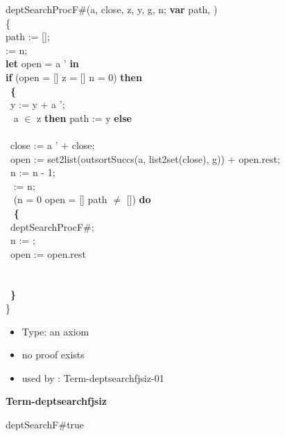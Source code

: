 \documentclass[a4paper]{article}
\begin{document}
deptSearchProcF\#(a, close, z, y, g, n; {\bf var} path, ) \\
\{\\
path := [];\\
  := n;\\
 {\bf let} open = a ' {\bf in}\\
 {\bf if} \Not (open = [] \Or z = [] \Or n = 0) {\bf then}\\
 \tabif\  {\bf \{}\\
 \tabif\ \tabbe y := y + a ';\\
 \tabif\  a $\in$ z {\bf then} path := y {\bf else}\\
 \tabif\ \tabbe  {\bf \{}\\
 \tabif\ \tabbe \tabbe close := a ' + close;\\
 \tabif\ \tabbe \tabbe open := set2list(outsortSuccs(a, list2set(close), g)) + open.rest;\\
 \tabif\ \tabbe \tabbe n := n - 1;\\
 \tabif\ \tabbe \tabbe {} := n;\\
 \tabif\ \tabbe {} \Not (n = 0 \Or open = [] \Or path $\neq$ []) {\bf do}\\
 \tabif\ \tabbe \tabbe {} {\bf \{}\\
 \tabif\ \tabbe \tabbe {}\tabbe deptSearchProcF\#;\\
 \tabif\ \tabbe \tabbe {}\tabbe n := ;\\
 \tabif\ \tabbe \tabbe {}\tabbe open := open.rest\\
 \tabif\ \tabbe \tabbe {}\\
 \tabif\ \tabbe {\bf \}}\\
 \tabif\ {\bf \}}\\
\}

\begin{itemize}

\item Type: an axiom

\item       no proof exists
\item       used by      : Term-deptsearchfjsiz-01
\end{itemize}

\medskip

{\LARGE\bf Term-deptsearchfjsiz}\label{lemma-Term-deptsearchfjsiz}

\medskip

 \Fol \Do deptSearchF\#\Dc true
\end{document}
